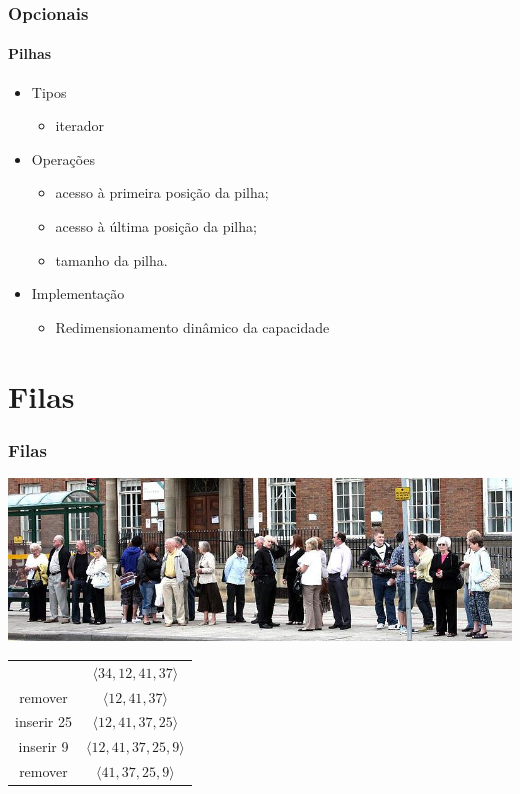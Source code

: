 \documentclass{beamer}
\begin{document}
\begin{frame}
  \frametitle{Opcionais}
  \framesubtitle{Pilhas}

  \begin{itemize}
    \item Tipos
      \begin{itemize}
        \item iterador
      \end{itemize}
    \item Operações
      \begin{itemize}
        \item acesso à primeira posição da pilha;
        \item acesso à última posição da pilha;
        \item tamanho da pilha.
      \end{itemize}
    \item Implementação
      \begin{itemize}
        \item Redimensionamento dinâmico da capacidade
      \end{itemize}
  \end{itemize}
\end{frame}

\section{Filas}

\begin{frame}
  \frametitle{Filas}

  \begin{center}
    \includegraphics[width=.8\textwidth]{img/queue.jpg}
  \end{center}
  \pause
  \begin{center}
    \begin{tabular}{cc}
      & $\langle 34, 12, 41, 37 \rangle$
      \\
      remover 
      \pause
      & $\langle 12, 41, 37 \rangle$
      \\
      inserir 25
      \pause
      & $\langle 12, 41, 37, 25 \rangle$
      \\
      inserir 9
      \pause
      & $\langle 12, 41, 37, 25, 9 \rangle$
      \\
      remover
      \pause
      & $\langle 41, 37, 25, 9 \rangle$
    \end{tabular}
  \end{center}

\end{frame}
\end{document}
